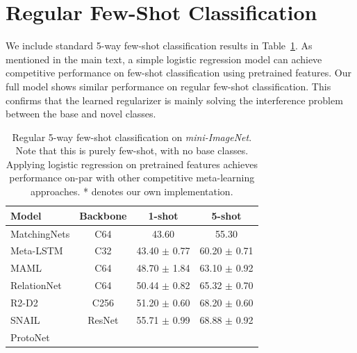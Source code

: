 \section{Regular Few-Shot Classification}
We include standard 5-way few-shot classification results in Table~\ref{tab:fewshot1_novel}. As
mentioned in the main text, a simple logistic regression model can achieve competitive performance
on few-shot classification using pretrained features. Our full model shows similar performance on
regular few-shot classification. This confirms that the learned regularizer is mainly solving the
interference problem between the base and novel classes.
\vspace{0.1in}

\begin{table}[h!]
\begin{small}
\begin{center}
\caption{Regular 5-way few-shot classification on \textit{mini-ImageNet}.
Note that this is purely few-shot, with no base classes. Applying logistic regression on pretrained
features achieves performance on-par with other competitive meta-learning approaches. * denotes our
own implementation.}
\label{tab:fewshot1_novel}
\begin{tabular}{lccc}
\toprule
Model        & Backbone & 1-shot                & 5-shot                \\
\midrule                                                             
MatchingNets \citep{matching} 
             & C64      & 43.60                 & 55.30                 \\
Meta-LSTM \citep{metalstm} 
           & C32      & 43.40 $\pm$ 0.77      & 60.20 $\pm$ 0.71      \\
MAML \citep{maml}
             & C64      & 48.70 $\pm$ 1.84      & 63.10 $\pm$ 0.92      \\
RelationNet \citep{relationnet} 
             & C64      & 50.44 $\pm$ 0.82      & 65.32 $\pm$ 0.70      \\
R2-D2  \citep{diffsolver} 
           & C256     & 51.20 $\pm$ 0.60      & 68.20 $\pm$ 0.60      \\
SNAIL \citep{mishra2017meta} 
           & ResNet   & 55.71 $\pm$ 0.99      & 68.88 $\pm$ 0.92      \\
ProtoNet \citep{proto} 

\end{tabular}
\end{center}
\end{small}
\end{table}
